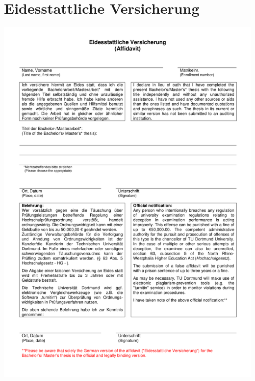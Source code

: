 \documentclass[12pt,a4paper, usenames, dvipsnames]{article}
\theoremstyle{mystyle}
\theoremstyle{definition}
\begin{document}
\section{Eidesstattliche Versicherung} %
\vspace*{-3em}
\begin{center}
\includegraphics[scale=0.8]{Eidesstattliche_Versicherung.pdf}
\end{center}










%
%
%
%
%
%
%
%
%
%
%
%
%
%
%
%
%
%
\end{document}
